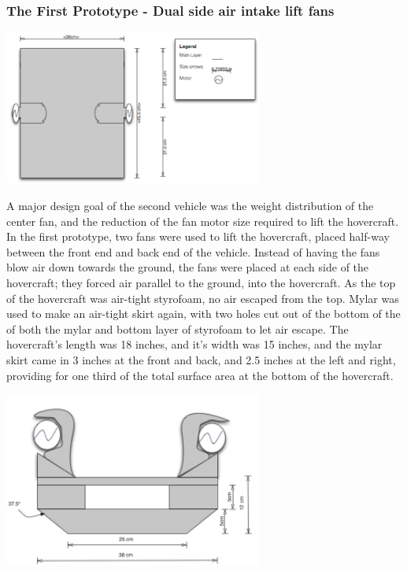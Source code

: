 \begin{minipage}{6.5in}
\begin{minipage}{6.5in}
\subsubsection{The First Prototype - Dual side air intake lift fans}

\begin{minipage}{6.5in}
\begin{center}
  \includegraphics[width=85mm]{imageSources/top2.png}
\end{center}
\label{top2}
\end{minipage}

A major design goal of the second vehicle was the weight distribution of the center fan, and the reduction of the fan motor size required to lift the hovercraft. In the first
prototype, two fans were used to lift the hovercraft, placed half-way between the front end
and back end of the vehicle. Instead of having the fans blow air down towards the ground, the fans were placed at each side
of the hovercraft; they forced air parallel to the ground, into the hovercraft. As the top of the hovercraft was
air-tight styrofoam, no air escaped from the top.  Mylar was used to make an air-tight skirt again, with two holes cut out
of the bottom of the of both the mylar and bottom layer of styrofoam to let air escape. The hovercraft's length was 18 inches,
and it's width was 15 inches, and the mylar skirt came in 3 inches at the front and back, and 2.5 inches at the left and right,
providing for one third of the total surface area at the bottom of the hovercraft.

\begin{minipage}{6.5in}
\begin{center}
  \includegraphics[width=85mm]{imageSources/Front2.png}
\end{center}
\label{Front2}
\end{minipage}


\end{minipage}
\end{minipage}
